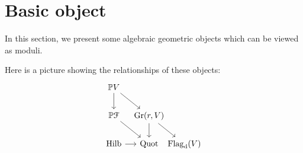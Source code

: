 \section{Basic object}
In this section, we present some algebraic geometric objects which can be viewed as moduli.

Here is a picture showing the relationships of these objects:
\[\begin{tikzcd}[row sep={12mm,between origins}, column sep={15mm,between origins}]
\mathbb{P}V \arrow[d] \arrow[rd] &                                 &           \\
\mathbb{P}\mathcal{F} \arrow[rd] & {\Gr(r,V)} \arrow[d] \arrow[rd] &           \\
\Hilb \arrow[r]                  & \Quot                           & \Flagd(V)
\end{tikzcd}\]
